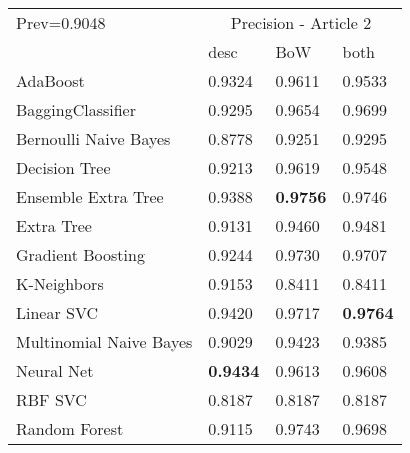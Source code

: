 \begin{tabular}{|l|l|l|l| }
\hline
Prev=0.9048 &  \multicolumn{3}{c|}{Precision - Article 2} \\
\cline{2-4} & desc & BoW & both \\ \hline
AdaBoost                & 0.9324 & 0.9611 & 0.9533\\
BaggingClassifier       & 0.9295 & 0.9654 & 0.9699\\
Bernoulli Naive Bayes   & 0.8778 & 0.9251 & 0.9295\\
Decision Tree           & 0.9213 & 0.9619 & 0.9548\\
Ensemble Extra Tree     & 0.9388 & {\bf 0.9756} & 0.9746\\
Extra Tree              & 0.9131 & 0.9460 & 0.9481\\
Gradient Boosting       & 0.9244 & 0.9730 & 0.9707\\
K-Neighbors             & 0.9153 & 0.8411 & 0.8411\\
Linear SVC              & 0.9420 & 0.9717 & {\bf 0.9764}\\
Multinomial Naive Bayes & 0.9029 & 0.9423 & 0.9385\\
Neural Net              & {\bf 0.9434} & 0.9613 & 0.9608\\
RBF SVC                 & 0.8187 & 0.8187 & 0.8187\\
Random Forest           & 0.9115 & 0.9743 & 0.9698\\
\hline
\end{tabular}